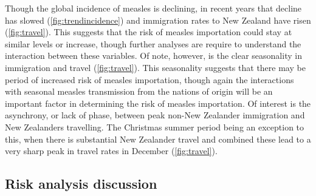 \documentclass{article}
\begin{document}
Though the global incidence of measles is declining, in recent years that decline has slowed (\autoref{fig:trendincidence}) and immigration rates to New Zealand have risen (\autoref{fig:travel}). This suggests that the risk of measles importation could stay at similar levels or increase, though further analyses are require to understand the interaction between these variables.  Of note, however, is the clear seasonality in immigration and travel (\autoref{fig:travel}).  This seasonality suggests that there may be period of increased risk of measles importation, though again the interactions with seasonal measles transmission from the nations of origin will be an important factor in determining the risk of measles importation. Of interest is the asynchrony, or lack of phase, between peak non-New Zealander immigration and New Zealanders travelling. The Christmas summer period being an exception to this, when there is substantial New Zealander travel and combined these lead to a very sharp peak in travel rates in December (\autoref{fig:travel}).

\subsection*{Risk analysis discussion}
\end{document}
